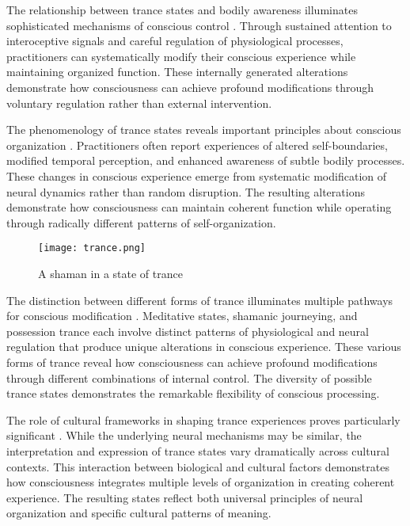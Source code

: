 The relationship between trance states and bodily awareness illuminates sophisticated mechanisms of conscious control \cite{Goodman1988}. Through sustained attention to interoceptive signals and careful regulation of physiological processes, practitioners can systematically modify their conscious experience while maintaining organized function. These internally generated alterations demonstrate how consciousness can achieve profound modifications through voluntary regulation rather than external intervention.

The phenomenology of trance states reveals important principles about conscious organization \cite{Lapassade1990}. Practitioners often report experiences of altered self-boundaries, modified temporal perception, and enhanced awareness of subtle bodily processes. These changes in conscious experience emerge from systematic modification of neural dynamics rather than random disruption. The resulting alterations demonstrate how consciousness can maintain coherent function while operating through radically different patterns of self-organization.

\begin{figure}[h]
    \centering
    \texttt{[image: trance.png]}

    \caption{A shaman in a state of trance}
\end{figure}

The distinction between different forms of trance illuminates multiple pathways for conscious modification \cite{Bourguignon1973}. Meditative states, shamanic journeying, and possession trance each involve distinct patterns of physiological and neural regulation that produce unique alterations in conscious experience. These various forms of trance reveal how consciousness can achieve profound modifications through different combinations of internal control. The diversity of possible trance states demonstrates the remarkable flexibility of conscious processing.

The role of cultural frameworks in shaping trance experiences proves particularly significant \cite{Lewis2003}. While the underlying neural mechanisms may be similar, the interpretation and expression of trance states vary dramatically across cultural contexts. This interaction between biological and cultural factors demonstrates how consciousness integrates multiple levels of organization in creating coherent experience. The resulting states reflect both universal principles of neural organization and specific cultural patterns of meaning.

